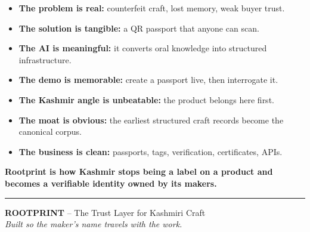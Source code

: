 \documentclass[11pt,a4paper]{article}
\begin{document}
\begin{itemize}
  \item \textbf{The problem is real:} counterfeit craft, lost memory, weak buyer trust.
  \item \textbf{The solution is tangible:} a QR passport that anyone can scan.
  \item \textbf{The AI is meaningful:} it converts oral knowledge into structured infrastructure.
  \item \textbf{The demo is memorable:} create a passport live, then interrogate it.
  \item \textbf{The Kashmir angle is unbeatable:} the product belongs here first.
  \item \textbf{The moat is obvious:} the earliest structured craft records become the canonical corpus.
  \item \textbf{The business is clean:} passports, tags, verification, certificates, APIs.
\end{itemize}

\begin{goldbox}
\textbf{Rootprint is how Kashmir stops being a label on a product and becomes a verifiable identity owned by its makers.}
\end{goldbox}

\vspace{0.5em}
\noindent\color{saffron}\rule{\linewidth}{1pt}

\begin{center}
\small\color{slate}
\textbf{ROOTPRINT} -- The Trust Layer for Kashmiri Craft\\
\textit{Built so the maker's name travels with the work.}
\end{center}
\end{document}
